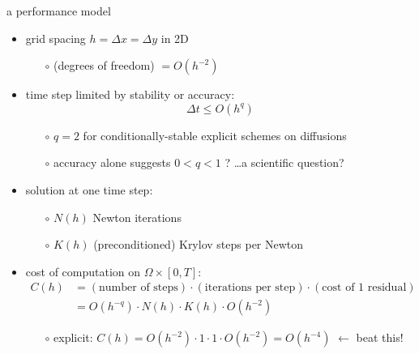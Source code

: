 \documentclass[hide notes,intlimits,usenames,dvipsnames]{beamer}
\begin{document}
\begin{frame}{a performance model}

\begin{itemize}
\item grid spacing $h=\Delta x = \Delta y$ in 2D
    \begin{itemize}
    \item[$\circ$] (degrees of freedom) $=O(h^{-2})$
    \end{itemize}
\item time step limited by stability or accuracy:
    $$\Delta t \le O(h^q)$$

\vspace{-3mm}
    \begin{itemize}
    \item[$\circ$] $q=2$ for conditionally-stable explicit schemes on diffusions
    \item[$\circ$] accuracy alone suggests $0<q<1$ ? \dots a scientific question?
    \end{itemize}
\item solution at one time step:
    \begin{itemize}
    \item[$\circ$] $N(h)$ Newton iterations
    \item[$\circ$] $K(h)$ (preconditioned) Krylov steps per Newton
    \end{itemize}

\medskip
\item cost of computation on $\Omega \times [0,T]$:
\footnotesize
\begin{align*}
C(h) &= (\text{number of steps}) \cdot (\text{iterations per step}) \cdot (\text{cost of 1 residual}) \\
  &= O(h^{-q}) \cdot N(h) \cdot K(h) \cdot O(h^{-2})
\end{align*}
\normalsize

\vspace{-2mm}
    \begin{itemize}
    \item[$\circ$] explicit: $C(h) = O(h^{-2}) \cdot 1 \cdot 1 \cdot O(h^{-2}) = O(h^{-4})$ \hfill \alert{$\leftarrow$ beat this!}
    \end{itemize}
\end{itemize}
\end{frame}
\end{document}
